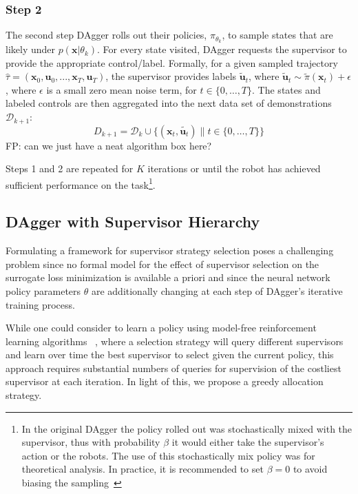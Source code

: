\documentclass[10pt, conference]{ieeeconf}      %
\newcommand{\bu}{\mathbf{u}}
\newcommand{\bx}{\mathbf{x}}
\newcommand{\fpnote}[1]{\ifthenelse{ \boolean{include-notes}}%
 {\textcolor{blue}{\textbf{FP: #1}}}{}}
\begin{document}
 \subsubsection{Step 2}
The second step  DAgger rolls out their policies, $\pi_{\theta_{k}}$, to sample states that are likely under $p(\bx|\theta_{k})$.  For every state visited, DAgger requests the supervisor to provide the appropriate control/label. Formally, for a given sampled trajectory  $\hat{\tau} = (\bx_0,\bu_0,...,\bx_T,\bu_T )$, the supervisor provides labels $\tilde{\bu}_t$, where $\tilde{\bu}_t \sim \tilde{\pi}(\bx_t) + \epsilon$, where $\epsilon$ is a small zero mean noise term, for $t\in \{0, \ldots, T\}$.
The states and labeled controls are then aggregated into the next data set of demonstrations $\mathcal{D}_{k+1}$:
$$D_{k+1}=\mathcal{D}_k \cup \{(\bx_t,\tilde{\bu_t})\|t\in\{0,\ldots,T\}\} $$
{\color{blue}FP: can we just have a neat algorithm box here?}

Steps 1 and 2 are repeated for $K$ iterations or until 
the robot has achieved sufficient performance on the task\footnote{In the original DAgger the policy rolled out
was stochastically mixed with the supervisor, thus with probability $\beta$ it would either take the supervisor's action
or the robots. The use of this stochastically mix policy was for theoretical analysis. In practice, it is recommended
to set $\beta = 0$ to avoid biasing the sampling~\cite{NIPS2014_5421,ross2010reduction}}.


\subsection{DAgger with Supervisor Hierarchy}
Formulating a framework for supervisor strategy selection poses a challenging problem since no formal model
for the effect of supervisor selection on the surrogate loss minimization is available a priori and since the
neural network policy parameters $\theta$ are additionally changing at each step of DAgger's iterative training process.

While one could consider to learn a policy using model-free reinforcement learning algorithms
~\cite{sutton1998reinforcement}, where a selection strategy will query different supervisors and learn over time the
best supervisor to select given the current policy, this approach requires substantial numbers of 
queries for supervision of the costliest supervisor at each iteration. In light of this, we propose a greedy allocation
strategy.
\end{document}
